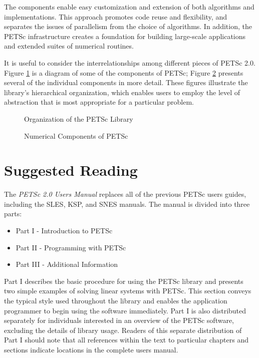 The components enable easy customization and extension of both algorithms
and implementations.  This approach promotes code reuse and
flexibility, and separates the issues of parallelism from the choice
of algorithms.  In addition, the PETSc infrastructure creates a
foundation for building large-scale applications and extended suites
of numerical routines.

It is useful to consider the interrelationships among different
pieces of PETSc 2.0.  Figure \ref{fig:1} is a diagram of some 
of the components of PETSc; Figure \ref{fig:2} presents
several of the individual components in more detail.
These figures illustrate the library's hierarchical organization,
which enables users to employ the level of abstraction that is most 
appropriate for a particular problem.  
\begin{figure}[hbt]
\centerline{}
\caption{Organization of the PETSc Library}
\label{fig:1}
\end{figure}

\begin{figure}[hbt]
\centerline{}
\caption{Numerical Components of PETSc}
\label{fig:2}
\end{figure}

\section{Suggested Reading}

The {\em PETSc 2.0 Users Manual} replaces all of the previous PETSc users
guides, including the SLES, KSP, and SNES manuals.  The manual is
divided into three parts:
\begin{itemize}
\item Part I - Introduction to PETSc
\item Part II - Programming with PETSc
\item Part III - Additional Information
\end{itemize}

Part I describes
the basic procedure for using the PETSc library and presents two
simple examples of solving linear systems with PETSc.  This section
conveys the typical style used throughout the library and enables the
application programmer to begin using the software immediately.
Part I is also distributed separately for individuals interested in an 
overview of the PETSc software, excluding the details of library usage.
Readers of this separate distribution of Part I should note that all
references within the text to particular chapters and sections 
indicate locations in the complete users manual.

